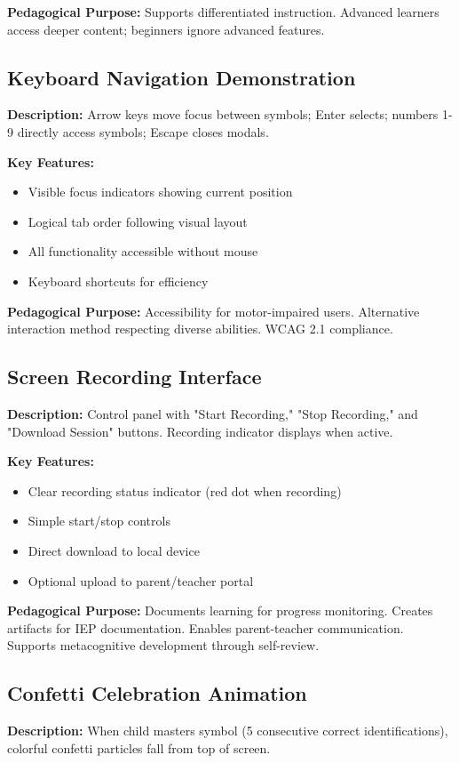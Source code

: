 \documentclass[11pt, a4paper]{article}
\begin{document}
\textbf{Pedagogical Purpose:} Supports differentiated instruction. Advanced learners access deeper content; beginners ignore advanced features.

\subsection{Keyboard Navigation Demonstration}
\textbf{Description:} Arrow keys move focus between symbols; Enter selects; numbers 1-9 directly access symbols; Escape closes modals.

\textbf{Key Features:}
\begin{itemize}[leftmargin=*, noitemsep]
    \item Visible focus indicators showing current position
    \item Logical tab order following visual layout
    \item All functionality accessible without mouse
    \item Keyboard shortcuts for efficiency
\end{itemize}

\textbf{Pedagogical Purpose:} Accessibility for motor-impaired users. Alternative interaction method respecting diverse abilities. WCAG 2.1 compliance.

\subsection{Screen Recording Interface}
\textbf{Description:} Control panel with "Start Recording," "Stop Recording," and "Download Session" buttons. Recording indicator displays when active.

\textbf{Key Features:}
\begin{itemize}[leftmargin=*, noitemsep]
    \item Clear recording status indicator (red dot when recording)
    \item Simple start/stop controls
    \item Direct download to local device
    \item Optional upload to parent/teacher portal
\end{itemize}

\textbf{Pedagogical Purpose:} Documents learning for progress monitoring. Creates artifacts for IEP documentation. Enables parent-teacher communication. Supports metacognitive development through self-review.

\subsection{Confetti Celebration Animation}
\textbf{Description:} When child masters symbol (5 consecutive correct identifications), colorful confetti particles fall from top of screen.
\end{document}
